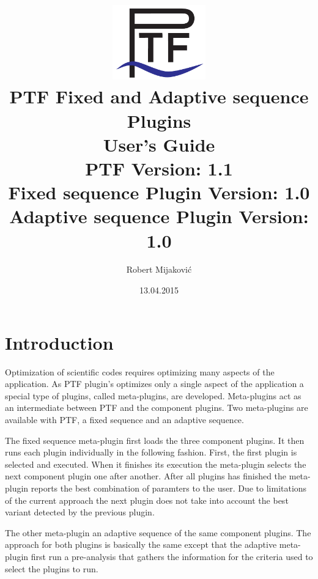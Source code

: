\documentclass[11pt,a4paper, oneside]{book} %
\begin{document}
\title{\includegraphics[width=4cm]{../images/Ptf_LogoBlau}\\ \vspace{1cm}
\textsf{\bf \huge PTF Fixed and Adaptive sequence Plugins\\ User's Guide}\\
       \normalsize PTF Version: 1.1\\
       Fixed sequence Plugin Version: 1.0\\
       Adaptive sequence Plugin Version: 1.0}
\author{Robert Mijakovi\'{c}}
\date{13.04.2015}

\maketitle
\tableofcontents

\chapter{Introduction}

Optimization of scientific codes requires optimizing many aspects of the application. As PTF plugin's optimizes only a single aspect of the application a special type of plugins, called meta-plugins, are developed. Meta-plugins act as an intermediate between PTF and the component plugins. Two meta-plugins are available with PTF, a fixed sequence and an adaptive sequence.

The fixed sequence meta-plugin first loads the three component plugins. It then runs each plugin individually in the following fashion. First, the first plugin is selected and executed. When it finishes its execution the meta-plugin selects the next component plugin one after another. After all plugins has finished the meta-plugin reports the best combination of paramters to the user. Due to limitations of the current approach the next plugin does not take into account the best variant detected by the previous plugin.

The other meta-plugin an adaptive sequence of the same component plugins. The approach for both plugins is basically the same except that the adaptive meta-plugin first run a pre-analysis that gathers the information for the criteria used to select the plugins to run.
\end{document}
